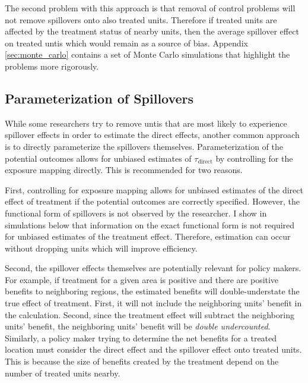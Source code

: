 \documentclass[11pt]{article}
\begin{document}
The second problem with this approach is that removal of control problems will not remove spillovers onto also treated units. Therefore if treated units are affected by the treatment status of nearby units, then the average spillover effect on treated untis which would remain as a source of bias. Appendix \ref{sec:monte_carlo} contains a set of Monte Carlo simulations that highlight the problems more rigorously.

\subsection{Parameterization of Spillovers}
\label{sec:parameterize}

While some researchers try to remove untis that are most likely to experience spillover effects in order to estimate the direct effects, another common approach is to directly parameterize the spillovers themselves. Parameterization of the potential outcomes allows for unbiased estimates of $\tau_{\text{direct}}$ by controlling for the exposure mapping directly. This is recommended for two reasons. 

First, controlling for exposure mapping allows for unbiased estimates of the direct effect of treatment if the potential outcomes are correctly specified. However, the functional form of spillovers is not observed by the researcher. I show in simulations below that information on the exact functional form is not required for unbiased estimates of the treatment effect. Therefore, estimation can occur without dropping units which will improve efficiency.

Second, the spillover effects themselves are potentially relevant for policy makers. For example, if treatment for a given area is positive and there are positive benefits to neighboring regions, the estimated benefits will double-understate the true effect of treatment. First, it will not include the neighboring units' benefit in the calculation. Second, since the treatment effect will subtract the neighboring units' benefit, the neighboring units' benefit will be \emph{double undercounted}. Similarly, a policy maker trying to determine the net benefits for a treated location must consider the direct effect and the spillover effect onto treated units. This is because the size of benefits created by the treatment depend on the number of treated units nearby.
\end{document}
